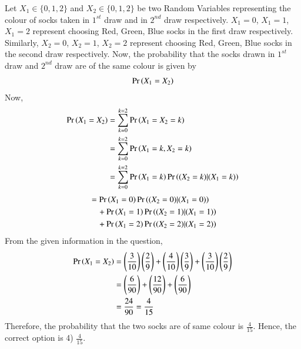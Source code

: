 Let $X_1 \in \{0,1,2\}$ and $X_2 \in \{0,1,2\}$ be two Random Variables representing the colour of socks taken in $1^{st}$ draw and in $2^{nd}$ draw respectively.
$X_1 = 0$, $X_1 = 1$, $X_1 = 2$ represent choosing Red, Green, Blue socks in the first draw respectively.
Similarly, $X_2 = 0$, $X_2 = 1$, $X_2 = 2$ represent choosing Red, Green, Blue socks in the second draw respectively.
Now, the probability that the socks drawn in $1^{st}$ draw and $2^{nd}$ draw are of the same colour is given by
\begin{align*}
\Pr\left(X_1 = X_2\right)    
\end{align*}
Now,
\begin{align}
\Pr\left(X_1 = X_2\right) &= \sum_{k = 0}^{k = 2} \Pr\left(X_1 = X_2 = k\right) \\
&= \sum_{k = 0}^{k = 2} \Pr\left(X_1 = k, X_2 = k\right) \\
&= \sum_{k = 0}^{k = 2} \Pr\left(X_1 = k\right) \Pr\left((X_2 = k) | (X_1 = k)\right)
\end{align}
\begin{align}
&= \Pr\left(X_1 = 0\right) \Pr\left((X_2 = 0) | (X_1 = 0)\right) \\ \nonumber
& \quad + \Pr\left(X_1 = 1\right) \Pr\left((X_2 = 1) | (X_1 = 1)\right) \\ \nonumber
& \quad + \Pr\left(X_1 = 2\right) \Pr\left((X_2 = 2) | (X_1 = 2)\right)
\end{align}
From the given information in the question,
\begin{align}
\Pr\left(X_1 = X_2\right) &= \left(\frac{3}{10} \right) \left(\frac{2}{9} \right) + \left(\frac{4}{10} \right) \left(\frac{3}{9} \right) + \left(\frac{3}{10} \right) \left(\frac{2}{9} \right) \\
&= \left(\frac{6}{90} \right) + \left(\frac{12}{90} \right) + \left(\frac{6}{90} \right) \\
&= \frac{24}{90} = \frac{4}{15}
\end{align}
Therefore, the probability that the two socks are of same colour is $\frac{4}{15}$.
Hence, the correct option is 4) $\frac{4}{15}$.
